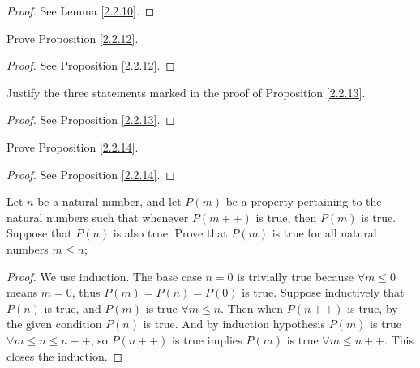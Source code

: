\begin{proof}
    See Lemma \ref{2.2.10}.
\end{proof}

\begin{exercise}\label{ex 2.2.3}
    Prove Proposition \ref{2.2.12}.
\end{exercise}

\begin{proof}
    See Proposition \ref{2.2.12}.
\end{proof}

\begin{exercise}\label{ex 2.2.4}
    Justify the three statements marked in the proof of Proposition \ref{2.2.13}.
\end{exercise}

\begin{proof}
    See Proposition \ref{2.2.13}.
\end{proof}

\begin{exercise}\label{ex 2.2.5}
    Prove Proposition \ref{2.2.14}.
\end{exercise}

\begin{proof}
    See Proposition \ref{2.2.14}.
\end{proof}

\begin{exercise}\label{ex 2.2.6}
    Let \(n\) be a natural number, and let \(P(m)\) be a property pertaining to the natural numbers such that whenever \(P(m++)\) is true, then \(P(m)\) is true.
    Suppose that \(P(n)\) is also true.
    Prove that \(P(m)\) is true for all natural numbers \(m \leq n\);
\end{exercise}

\begin{proof}
    We use induction.
    The base case \(n = 0\) is trivially true because \(\forall m \leq 0\) means \(m = 0\), thus \(P(m) = P(n) = P(0)\) is true.
    Suppose inductively that \(P(n)\) is true, and \(P(m)\) is true \(\forall m \leq n\).
    Then when \(P(n++)\) is true, by the given condition \(P(n)\) is true.
    And by induction hypothesis \(P(m)\) is true \(\forall m \leq n \leq n++\), so \(P(n++)\) is true implies \(P(m)\) is true \(\forall m \leq n++\).
    This closes the induction.
\end{proof}